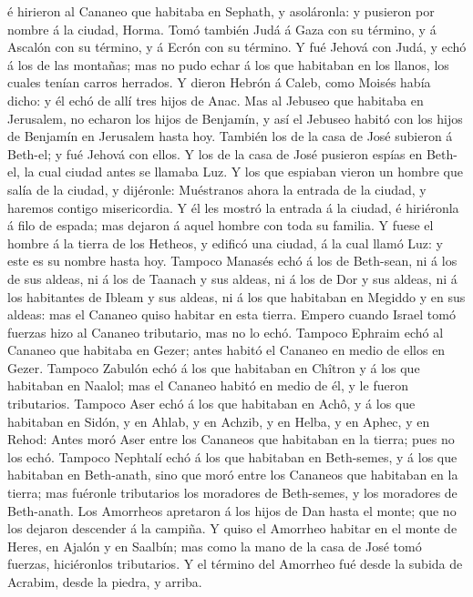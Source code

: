 é hirieron al Cananeo que habitaba en Sephath, y asoláronla: y pusieron
por nombre á la ciudad, Horma.  Tomó también Judá á Gaza
con su término, y á Ascalón con su término, y á Ecrón con su término.
 Y fué Jehová con Judá, y echó á los de las montañas; mas
no pudo echar á los que habitaban en los llanos, los cuales tenían
carros herrados.  Y dieron Hebrón á Caleb, como Moisés
había dicho: y él echó de allí tres hijos de Anac.  Mas
al Jebuseo que habitaba en Jerusalem, no echaron los hijos de Benjamín,
y así el Jebuseo habitó con los hijos de Benjamín en Jerusalem hasta
hoy.  También los de la casa de José subieron á Beth-el;
y fué Jehová con ellos.  Y los de la casa de José
pusieron espías en Beth-el, la cual ciudad antes se llamaba Luz.
 Y los que espiaban vieron un hombre que salía de la
ciudad, y dijéronle: Muéstranos ahora la entrada de la ciudad, y haremos
contigo misericordia.  Y él les mostró la entrada á la
ciudad, é hiriéronla á filo de espada; mas dejaron á aquel hombre con
toda su familia.  Y fuese el hombre á la tierra de los
Hetheos, y edificó una ciudad, á la cual llamó Luz: y este es su nombre
hasta hoy.  Tampoco Manasés echó á los de Beth-sean, ni á
los de sus aldeas, ni á los de Taanach y sus aldeas, ni á los de Dor y
sus aldeas, ni á los habitantes de Ibleam y sus aldeas, ni á los que
habitaban en Megiddo y en sus aldeas: mas el Cananeo quiso habitar en
esta tierra.  Empero cuando Israel tomó fuerzas hizo al
Cananeo tributario, mas no lo echó.  Tampoco Ephraim echó
al Cananeo que habitaba en Gezer; antes habitó el Cananeo en medio de
ellos en Gezer.  Tampoco Zabulón echó á los que habitaban
en Chîtron y á los que habitaban en Naalol; mas el Cananeo habitó en
medio de él, y le fueron tributarios.  Tampoco Aser echó
á los que habitaban en Achô, y á los que habitaban en Sidón, y en Ahlab,
y en Achzib, y en Helba, y en Aphec, y en Rehod:  Antes
moró Aser entre los Cananeos que habitaban en la tierra; pues no los
echó.  Tampoco Nephtalí echó á los que habitaban en
Beth-semes, y á los que habitaban en Beth-anath, sino que moró entre los
Cananeos que habitaban en la tierra; mas fuéronle tributarios los
moradores de Beth-semes, y los moradores de Beth-anath. 
Los Amorrheos apretaron á los hijos de Dan hasta el monte; que no los
dejaron descender á la campiña.  Y quiso el Amorrheo
habitar en el monte de Heres, en Ajalón y en Saalbín; mas como la mano
de la casa de José tomó fuerzas, hiciéronlos tributarios.
 Y el término del Amorrheo fué desde la subida de
Acrabim, desde la piedra, y arriba.

